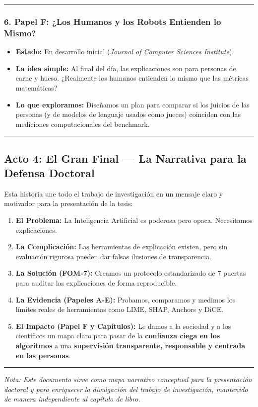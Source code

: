 \documentclass[
]{article}
\providecommand{\tightlist}{%
  \setlength{\itemsep}{0pt}\setlength{\parskip}{0pt}}
\begin{document}
\begin{center}\rule{0.5\linewidth}{0.5pt}\end{center}

\subsubsection{6. Papel F: ¿Los Humanos y los Robots Entienden lo
Mismo?}\label{papel-f-los-humanos-y-los-robots-entienden-lo-mismo}

\begin{itemize}
\tightlist
\item
  \textbf{Estado:} En desarrollo inicial (\emph{Journal of Computer
  Sciences Institute}).
\item
  \textbf{La idea simple:} Al final del día, las explicaciones son para
  personas de carne y hueso. ¿Realmente los humanos entienden lo mismo
  que las métricas matemáticas?
\item
  \textbf{Lo que exploramos:} Diseñamos un plan para comparar si los
  juicios de las personas (y de modelos de lenguaje usados como jueces)
  coinciden con las mediciones computacionales del benchmark.
\end{itemize}

\begin{center}\rule{0.5\linewidth}{0.5pt}\end{center}

\subsection{Acto 4: El Gran Final --- La Narrativa para la Defensa
Doctoral}\label{acto-4-el-gran-final-la-narrativa-para-la-defensa-doctoral}

Esta historia une todo el trabajo de investigación en un mensaje claro y
motivador para la presentación de la tesis:

\begin{enumerate}
\def\labelenumi{\arabic{enumi}.}
\tightlist
\item
  \textbf{El Problema:} La Inteligencia Artificial es poderosa pero
  opaca. Necesitamos explicaciones.
\item
  \textbf{La Complicación:} Las herramientas de explicación existen,
  pero sin evaluación rigurosa pueden dar falsas ilusiones de
  transparencia.
\item
  \textbf{La Solución (FOM-7):} Creamos un protocolo estandarizado de 7
  puertas para auditar las explicaciones de forma reproducible.
\item
  \textbf{La Evidencia (Papeles A-E):} Probamos, comparamos y medimos
  los límites reales de herramientas como LIME, SHAP, Anchors y DiCE.
\item
  \textbf{El Impacto (Papel F y Capítulos):} Le damos a la sociedad y a
  los científicos un mapa claro para pasar de la \textbf{confianza ciega
  en los algoritmos} a una \textbf{supervisión transparente, responsable
  y centrada en las personas}.
\end{enumerate}

\begin{center}\rule{0.5\linewidth}{0.5pt}\end{center}

\emph{Nota: Este documento sirve como mapa narrativo conceptual para la
presentación doctoral y para enriquecer la divulgación del trabajo de
investigación, mantenido de manera independiente al capítulo de libro.}
\end{document}
